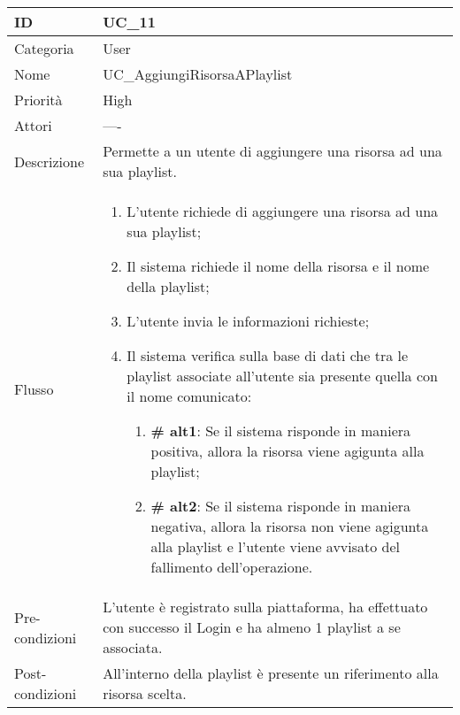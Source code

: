 \begin{center}
\begin{tabular}{ |p{2cm}|p{13cm}|  }
\hline
ID & UC\_11 \\\hline
Categoria & User\\\hline
Nome & UC\_AggiungiRisorsaAPlaylist\\\hline
Priorità & High \\\hline
Attori &  ---- \\\hline
Descrizione & Permette a un utente di aggiungere una risorsa ad una sua playlist.\\\hline
Flusso &  	\begin{enumerate}
			\item L'utente richiede di aggiungere una risorsa ad una sua playlist;
			\item Il sistema richiede il nome della risorsa e il nome della playlist;
			\item L'utente invia le informazioni richieste;
			\item Il sistema verifica sulla base di dati che tra le playlist associate all'utente sia presente quella con il nome comunicato:
			\begin{enumerate}[  ]
				\item \textbf{\# alt1}: Se il sistema risponde in maniera positiva, allora la risorsa viene agigunta alla playlist;
				\item \textbf{\# alt2}: Se il sistema risponde in maniera negativa, allora la risorsa non viene  agigunta alla playlist e l'utente viene avvisato del fallimento dell'operazione.
			\end{enumerate}
		\end{enumerate}\\\hline
Pre-condizioni & L'utente è registrato sulla piattaforma, ha effettuato con successo il Login e ha almeno 1 playlist a se associata.\\\hline
Post-condizioni & All'interno della playlist è presente un riferimento alla risorsa scelta.\\\hline
\end{tabular}
\label{table_use_case:11}\newline


\end{center}
